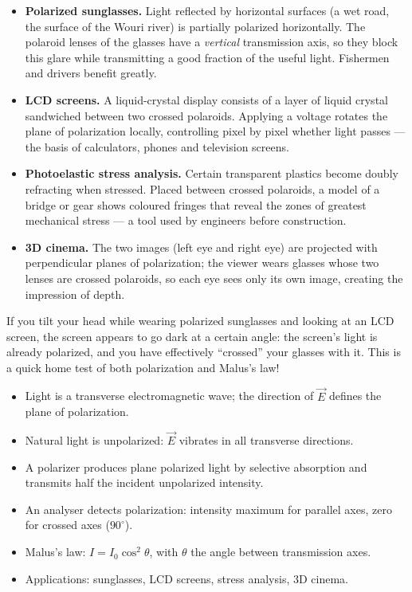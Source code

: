 \documentclass[11pt]{article}
\begin{document}
\begin{itemize}
\item \textbf{Polarized sunglasses.} Light reflected by horizontal surfaces (a wet road, the surface of the Wouri river) is partially polarized horizontally. The polaroid lenses of the glasses have a \emph{vertical} transmission axis, so they block this glare while transmitting a good fraction of the useful light. Fishermen and drivers benefit greatly.
\item \textbf{LCD screens.} A liquid-crystal display consists of a layer of liquid crystal sandwiched between two crossed polaroids. Applying a voltage rotates the plane of polarization locally, controlling pixel by pixel whether light passes --- the basis of calculators, phones and television screens.
\item \textbf{Photoelastic stress analysis.} Certain transparent plastics become doubly refracting when stressed. Placed between crossed polaroids, a model of a bridge or gear shows coloured fringes that reveal the zones of greatest mechanical stress --- a tool used by engineers before construction.
\item \textbf{3D cinema.} The two images (left eye and right eye) are projected with perpendicular planes of polarization; the viewer wears glasses whose two lenses are crossed polaroids, so each eye sees only its own image, creating the impression of depth.
\end{itemize}

\begin{savaistu}
If you tilt your head while wearing polarized sunglasses and looking at an LCD screen, the screen appears to go dark at a certain angle: the screen's light is already polarized, and you have effectively ``crossed'' your glasses with it. This is a quick home test of both polarization and Malus's law!
\end{savaistu}

\begin{aretenir}
\begin{itemize}
\item Light is a transverse electromagnetic wave; the direction of $\vec{E}$ defines the plane of polarization.
\item Natural light is unpolarized: $\vec{E}$ vibrates in all transverse directions.
\item A polarizer produces plane polarized light by selective absorption and transmits half the incident unpolarized intensity.
\item An analyser detects polarization: intensity maximum for parallel axes, zero for crossed axes ($90^{\circ}$).
\item Malus's law: $I = I_0\cos^2\theta$, with $\theta$ the angle between transmission axes.
\item Applications: sunglasses, LCD screens, stress analysis, 3D cinema.
\end{itemize}
\end{aretenir}
\end{document}
